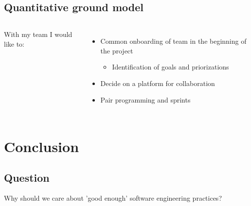 \documentclass[usenames,dvipsnames]{beamer}
\theoremstyle{plain}
\theoremstyle{definition}
\begin{document}
\subsection{Quantitative ground model}

\begin{frame}{\setframetitle{}}
  \begin{columns}[t]
    With my team I would like to: 
    \begin{itemize}
      \item Common onboarding of team in the beginning of the project 
      \begin{itemize}
        \item Identification of goals and priorizations 
      \end{itemize}
      
      \item Decide on a platform for collaboration
      
      \item Pair programming and sprints 
      
      
    \end{itemize}
  
  \end{columns}
  
\end{frame}







\section{Conclusion}
\subsection{Question}


\begin{frame}{\setframetitle{}}
  {
\centering


\Large  Why should we care about 'good enough' software engineering practices?

}
\end{frame}
\end{document}
